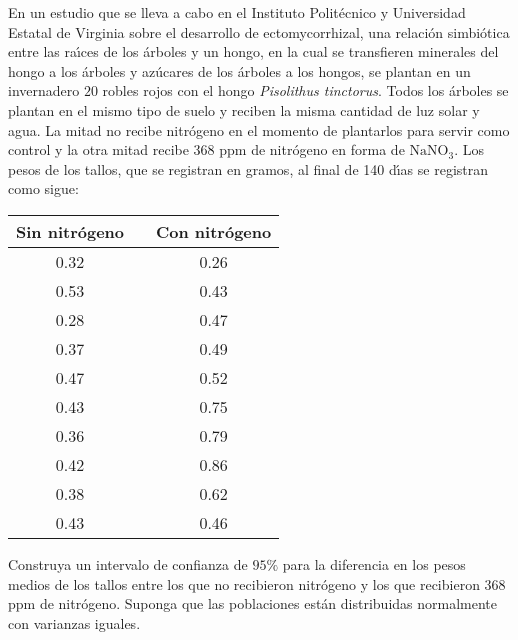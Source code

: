 \begin{enunciado}
 En un estudio que se lleva a cabo en el Instituto Polit\'ecnico y Universidad Estatal de Virginia sobre el desarrollo de ectomycorrhizal, una relaci\'on simbi\'otica entre las ra\'{\i}ces de los \'arboles y un hongo, en la cual se transfieren minerales del hongo a los \'arboles y az\'ucares de los \'arboles a los hongos, se plantan en un invernadero $20$ robles rojos con el hongo \textit{Pisolithus tinctorus}. Todos los \'arboles se plantan en el mismo tipo de suelo y reciben la misma cantidad de luz solar y agua. La mitad no recibe nitr\'ogeno en el momento de plantarlos para servir como control y la otra mitad recibe 368 ppm de nitr\'ogeno en forma de $\text{NaNO}_3$. Los pesos de los tallos, que se registran en gramos, al final de 140 d\'{\i}as se registran como sigue:
 \begin{center}
  \begin{tabular}{ccc}
   \textbf{Sin nitr\'ogeno} & \hspace{1cm} & \textbf{Con nitr\'ogeno} \\
   \hline 
   0.32 & & 0.26 \\
   0.53 & & 0.43 \\
   0.28 & & 0.47 \\
   0.37 & & 0.49 \\
   0.47 & & 0.52 \\
   0.43 & & 0.75 \\
   0.36 & & 0.79 \\
   0.42 & & 0.86 \\
   0.38 & & 0.62 \\
   0.43 & & 0.46 \\
   \hline
  \end{tabular}
 \end{center}
 Construya un intervalo de confianza de $95\%$ para la diferencia en los pesos medios de los tallos entre los que no recibieron nitr\'ogeno y los que recibieron 368 ppm de nitr\'ogeno. Suponga que las poblaciones est\'an distribuidas normalmente con varianzas iguales.
\end{enunciado}

